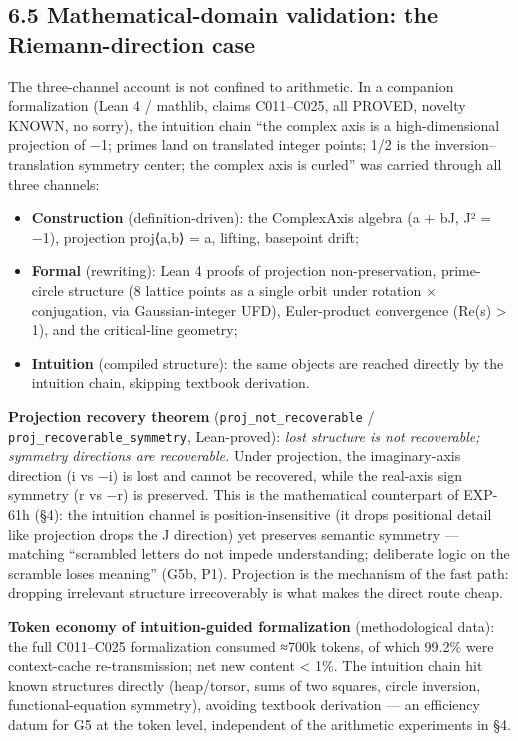 \documentclass[
]{article}
\providecommand{\tightlist}{%
  \setlength{\itemsep}{0pt}\setlength{\parskip}{0pt}}
\begin{document}
\subsection{6.5 Mathematical-domain validation: the Riemann-direction
case}\label{mathematical-domain-validation-the-riemann-direction-case}

The three-channel account is not confined to arithmetic. In a companion
formalization (Lean 4 / mathlib, claims C011--C025, all PROVED, novelty
KNOWN, no sorry), the intuition chain ``the complex axis is a
high-dimensional projection of −1; primes land on translated integer
points; 1/2 is the inversion--translation symmetry center; the complex
axis is curled'' was carried through all three channels:

\begin{itemize}
\tightlist
\item
  \textbf{Construction} (definition-driven): the ComplexAxis algebra (a
  + bJ, J² = −1), projection proj⟨a,b⟩ = a, lifting, basepoint drift;
\item
  \textbf{Formal} (rewriting): Lean 4 proofs of projection
  non-preservation, prime-circle structure (8 lattice points as a single
  orbit under rotation × conjugation, via Gaussian-integer UFD),
  Euler-product convergence (Re(s) \textgreater{} 1), and the
  critical-line geometry;
\item
  \textbf{Intuition} (compiled structure): the same objects are reached
  directly by the intuition chain, skipping textbook derivation.
\end{itemize}

\textbf{Projection recovery theorem} (\texttt{proj\_not\_recoverable} /
\texttt{proj\_recoverable\_symmetry}, Lean-proved): \emph{lost structure
is not recoverable; symmetry directions are recoverable.} Under
projection, the imaginary-axis direction (i vs −i) is lost and cannot be
recovered, while the real-axis sign symmetry (r vs −r) is preserved.
This is the mathematical counterpart of EXP-61h (§4): the intuition
channel is position-insensitive (it drops positional detail like
projection drops the J direction) yet preserves semantic symmetry ---
matching ``scrambled letters do not impede understanding; deliberate
logic on the scramble loses meaning'' (G5b, P1). Projection is the
mechanism of the fast path: dropping irrelevant structure irrecoverably
is what makes the direct route cheap.

\textbf{Token economy of intuition-guided formalization} (methodological
data): the full C011--C025 formalization consumed ≈700k tokens, of which
99.2\% were context-cache re-transmission; net new content \textless{}
1\%. The intuition chain hit known structures directly (heap/torsor,
sums of two squares, circle inversion, functional-equation symmetry),
avoiding textbook derivation --- an efficiency datum for G5 at the token
level, independent of the arithmetic experiments in §4.
\end{document}
